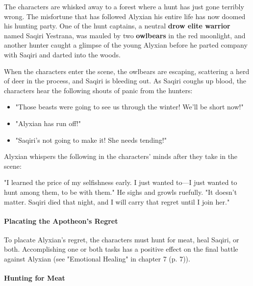 \documentclass[letterpaper, 11pt, bg=full, twocolumn]{dndbook}
\begin{document}
The characters are whisked away to a forest where a hunt has just gone terribly wrong. The misfortune that has followed Alyxian his entire life has now doomed his hunting party. One of the hunt captains, a neutral \textbf{drow elite warrior} named Saqiri Yestrana, was mauled by two \textbf{owlbears} in the red moonlight, and another hunter caught a glimpse of the young Alyxian before he parted company with Saqiri and darted into the woods.

When the characters enter the scene, the owlbears are escaping, scattering a herd of deer in the process, and Saqiri is bleeding out. As Saqiri coughs up blood, the characters hear the following shouts of panic from the hunters:

\begin{itemize}
\item "Those beasts were going to see us through the winter! We'll be short now!"
\item "Alyxian has run off!"
\item "Saqiri's not going to make it! She needs tending!"
\end{itemize}

Alyxian whispers the following in the characters' minds after they take in the scene:

\begin{DndReadAloud}
"I learned the price of my selfishness early. I just wanted to---I just wanted to hunt among them, to be with them." He sighs and growls ruefully. "It doesn't matter. Saqiri died that night, and I will carry that regret until I join her."
\end{DndReadAloud}

\paragraph{Placating the Apotheon's Regret}

To placate Alyxian's regret, the characters must hunt for meat, heal Saqiri, or both. Accomplishing one or both tasks has a positive effect on the final battle against Alyxian (see "Emotional Healing" in chapter 7 (p. 7)).

\paragraph{Hunting for Meat}
\end{document}

